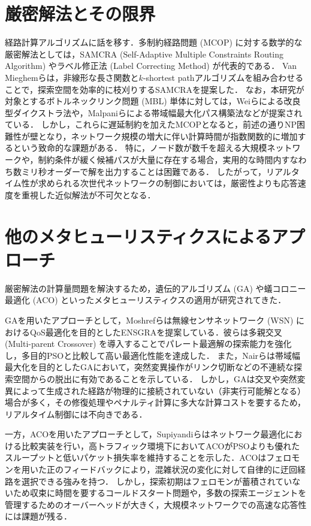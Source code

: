 \section{厳密解法とその限界}
経路計算アルゴリズムに話を移す．多制約経路問題 (MCOP) に対する数学的な厳密解法としては，SAMCRA (Self-Adaptive Multiple Constraints Routing Algorithm)\cite{van2004} やラベル修正法 (Label Correcting Method) \cite{guerriero2001}が代表的である．
Van Mieghemらは，非線形な長さ関数と$k$-shortest pathアルゴリズムを組み合わせることで，探索空間を効率的に枝刈りするSAMCRAを提案した\cite{van2004}．
なお，本研究が対象とするボトルネックリンク問題 (MBL) 単体に対しては，Weiらによる改良型ダイクストラ法\cite{Wei2019}や，Malpaniらによる帯域幅最大化パス構築法\cite{Malpani2002}などが提案されている．
しかし，これらに遅延制約を加えたMCOPとなると，前述の通りNP困難性が壁となり，ネットワーク規模の増大に伴い計算時間が指数関数的に増加するという致命的な課題がある．
特に，ノード数が数千を超える大規模ネットワークや，制約条件が緩く候補パスが大量に存在する場合，実用的な時間内すなわち数ミリ秒オーダーで解を出力することは困難である．
したがって，リアルタイム性が求められる次世代ネットワークの制御においては，厳密性よりも応答速度を重視した近似解法が不可欠となる．

\section{他のメタヒューリスティクスによるアプローチ}
厳密解法の計算量問題を解決するため，遺伝的アルゴリズム (GA) や蟻コロニー最適化 (ACO) といったメタヒューリスティクスの適用が研究されてきた．

GAを用いたアプローチとして，Moshrefらは無線センサネットワーク (WSN) におけるQoS最適化を目的としたENSGRAを提案している\cite{Moshref2021}．彼らは多親交叉 (Multi-parent Crossover) を導入することでパレート最適解の探索能力を強化し，多目的PSOと比較して高い最適化性能を達成した．
また，Nairらは帯域幅最大化を目的としたGAにおいて，突然変異操作がリンク切断などの不連続な探索空間からの脱出に有効であることを示している\cite{Nair2014}．
しかし，GAは交叉や突然変異によって生成された経路が物理的に接続されていない（非実行可能解となる）場合が多く，その修復処理やペナルティ計算に多大な計算コストを要するため，リアルタイム制御には不向きである．

一方，ACOを用いたアプローチとして，Supiyandiらはネットワーク最適化における比較実装を行い，高トラフィック環境下においてACOがPSOよりも優れたスループットと低いパケット損失率を維持することを示した\cite{Supiyandi2024}．ACOはフェロモンを用いた正のフィードバックにより，混雑状況の変化に対して自律的に迂回経路を選択できる強みを持つ．
しかし，探索初期はフェロモンが蓄積されていないため収束に時間を要するコールドスタート問題や，多数の探索エージェントを管理するためのオーバーヘッドが大きく，大規模ネットワークでの高速な応答性には課題が残る．

